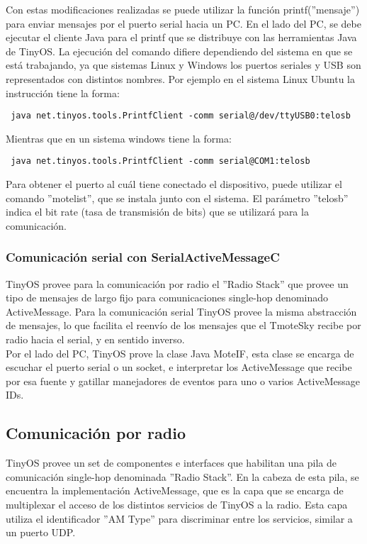Con estas modificaciones realizadas se puede utilizar la función printf(''mensaje'') para enviar mensajes por el puerto serial hacia un PC. En el lado del PC, se debe ejecutar el cliente Java para el printf que se distribuye con las herramientas Java de TinyOS. La ejecución del comando difiere dependiendo del sistema en que se está trabajando, ya que sistemas Linux y Windows los puertos seriales y USB son representados con distintos nombres. Por ejemplo en el sistema Linux Ubuntu la instrucción tiene la forma:
\begin{verbatim}
 java net.tinyos.tools.PrintfClient -comm serial@/dev/ttyUSB0:telosb
\end{verbatim}

Mientras que en un sistema windows tiene la forma:
\begin{verbatim}
 java net.tinyos.tools.PrintfClient -comm serial@COM1:telosb
\end{verbatim}

Para obtener el puerto al cuál tiene conectado el dispositivo, puede utilizar el comando ''motelist'', que se instala junto con el sistema. El parámetro ''telosb'' indica el bit rate (tasa de transmisión de bits) que se utilizará para la comunicación.

\subsubsection{Comunicación serial con SerialActiveMessageC}
TinyOS provee para la comunicación por radio el ''Radio Stack'' que provee un tipo de mensajes de largo fijo para comunicaciones single-hop denominado ActiveMessage. Para la comunicación serial TinyOS provee la misma abstracción de mensajes, lo que facilita el reenvío de los mensajes que el TmoteSky recibe por radio hacia el serial, y en sentido inverso.\\

Por el lado del PC, TinyOS prove la clase Java MoteIF, esta clase se encarga de escuchar el puerto serial o un socket, e interpretar los ActiveMessage que recibe por esa fuente y gatillar manejadores de eventos para uno o varios ActiveMessage IDs. 

\subsection{Comunicación por radio}
TinyOS provee un set de componentes e interfaces que habilitan una pila de comunicación single-hop denominada ''Radio Stack''. En la cabeza de esta pila, se encuentra la implementación ActiveMessage, que es la capa que se encarga de multiplexar el acceso de los distintos servicios de TinyOS a la radio. Esta capa utiliza el identificador ''AM Type'' para discriminar entre los servicios, similar a un puerto UDP. \\

